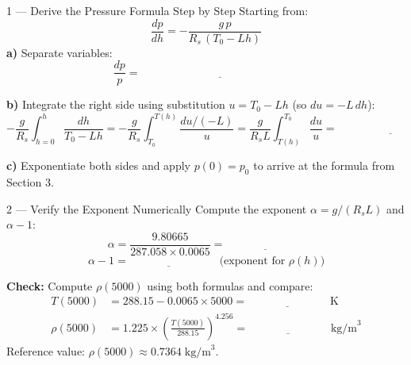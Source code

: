 \documentclass[12pt, a4paper]{article}
\begin{document}
\begin{exercisebox}{1 — Derive the Pressure Formula Step by Step}
Starting from:
\[
  \frac{dp}{dh} = -\frac{g\,p}{R_s\,(T_0 - Lh)}
\]
\textbf{a)} Separate variables:
\[
  \frac{dp}{p} = \underline{\hspace{6cm}}
\]

\textbf{b)} Integrate the right side using substitution $u = T_0 - Lh$ (so $du = -L\,dh$):
\[
  -\frac{g}{R_s}\int_{h=0}^{h} \frac{dh}{T_0 - Lh}
  = -\frac{g}{R_s}\int_{T_0}^{T(h)}\frac{du/(-L)}{u}
  = \frac{g}{R_s L}\int_{T(h)}^{T_0}\frac{du}{u}
  = \underline{\hspace{4cm}}
\]

\textbf{c)} Exponentiate both sides and apply $p(0) = p_0$ to arrive at the formula from Section 3.
\end{exercisebox}

\begin{solutionspace}[9cm]
\end{solutionspace}

\begin{exercisebox}{2 — Verify the Exponent Numerically}
Compute the exponent $\alpha = g/(R_s L)$ and $\alpha - 1$:
\[
  \alpha = \frac{9.80665}{287.058 \times 0.0065} = \underline{\hspace{3cm}}
\]
\[
  \alpha - 1 = \underline{\hspace{3cm}} \quad \text{(exponent for } \rho(h) \text{)}
\]

\textbf{Check:} Compute $\rho(5000)$ using both formulas and compare:
\begin{align*}
  T(5000) &= 288.15 - 0.0065 \times 5000 = \underline{\hspace{3cm}}\;\text{K} \\
  \rho(5000) &= 1.225 \times \left(\frac{T(5000)}{288.15}\right)^{4.256} = \underline{\hspace{3cm}}\;\text{kg/m}^3
\end{align*}
Reference value: $\rho(5000) \approx 0.7364\;\text{kg/m}^3$.
\end{exercisebox}

\begin{solutionspace}[6cm]
\end{solutionspace}
\end{document}

